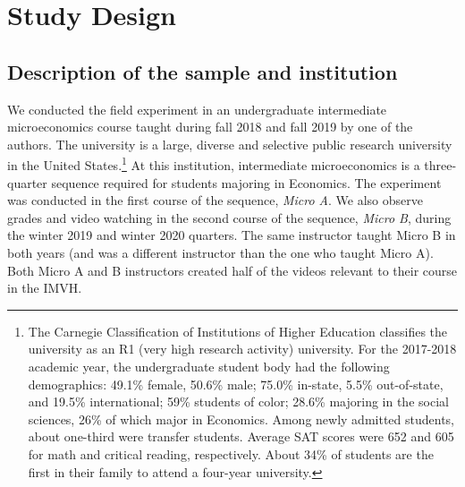 \documentclass[12pt]{article}
\begin{document}

\section{Study Design} \label{sec:studydesign}

\subsection{Description of the sample and institution}\label{subsec:description}

We conducted the field experiment in an undergraduate intermediate microeconomics course taught during fall 2018 and fall 2019 by one of the authors.
The university is a large, diverse and selective public research university in the United States.\footnote{The Carnegie Classification of Institutions of Higher Education classifies the university as an R1 (very high research activity) university. For the 2017-2018 academic year, the  undergraduate student body had the following demographics: 49.1\% female, 50.6\% male; 75.0\% in-state, 5.5\% out-of-state, and 19.5\% international; 59\% students of color; 28.6\% majoring in the social sciences, 26\% of which major in Economics. Among newly admitted students, about one-third were transfer students.  Average SAT scores were 652 and 605 for math and critical reading, respectively. About 34\% of students are the first in their family to attend a four-year university.} At this institution, intermediate microeconomics is a three-quarter sequence required for students majoring in Economics.
The experiment was conducted in the first course of the sequence, \textit{Micro A}.
We also observe grades and video watching in the second course of the sequence, \textit{Micro B}, during the winter 2019 and winter 2020 quarters.
The same instructor taught Micro B in both years (and was a different instructor than the one who taught Micro A).
Both Micro A and B instructors created half of the videos relevant to their course in the IMVH.
\end{document}
